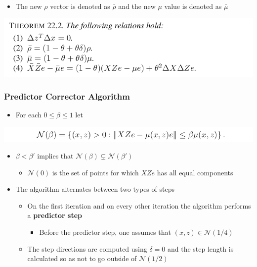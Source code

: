 \documentclass[11pt]{article}
\begin{document}
\begin{itemize}
\item The new \(\rho\) vector is denoted as \(\bar \rho\) and the new \(\mu\) value is denoted as \(\bar \mu\)
\end{itemize}
\begin{center}
\includegraphics[width=.9\linewidth]{The Homogeneous Self-Dual Method/screenshot_2019-03-11_18-10-05.png}
\end{center}

\subsubsection{Predictor Corrector Algorithm}
\label{sec:orgb49fcc6}
\begin{itemize}
\item For each \(0\leq \beta \leq 1\) let
\end{itemize}
\begin{center}
\includegraphics[width=.9\linewidth]{The Homogeneous Self-Dual Method/screenshot_2019-03-11_18-22-54.png}
\end{center}
\begin{itemize}
\item \(\beta < \beta'\) implies that \(\mathcal N(\beta) \subsetneq \mathcal N(\beta')\) 
\begin{itemize}
\item \(\mathcal N(0)\) is the set of points for which \(XZe\) has all equal components
\end{itemize}

\item The algorithm alternates between two types of steps
\begin{itemize}
\item On the first iteration and on every other iteration the algorithm performs a \textbf{predictor step}
\begin{itemize}
\item Before the predictor step, one assumes that \((x,z) \in \mathcal N (1/4)\)
\end{itemize}
\item The step directions are computed using \(\delta = 0\) and the step length is calculated so as not to go outside of \(\mathcal N (1/2)\)
\end{itemize}
\end{itemize}
\end{document}
